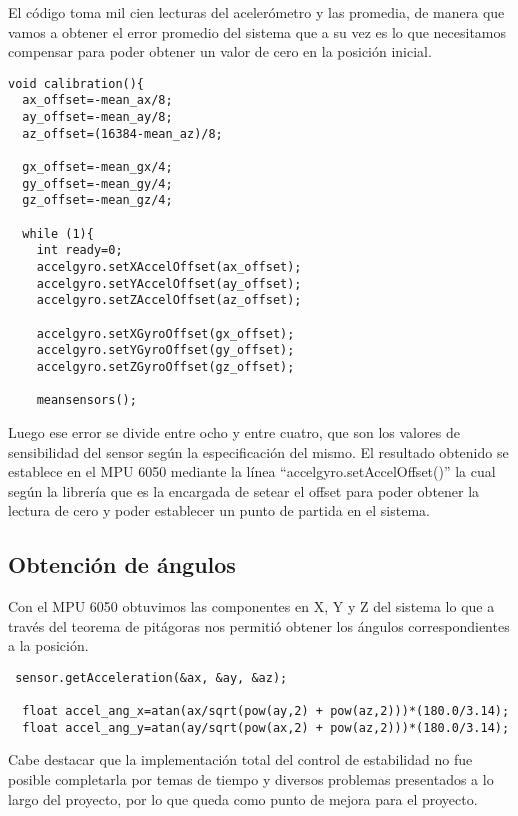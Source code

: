 \documentclass[12pt,letterpaper]{IEEEtran}
\begin{document}
El código toma mil cien lecturas del acelerómetro y las promedia, de manera que vamos a obtener el error promedio del sistema que a su vez es lo que necesitamos compensar para poder obtener un valor de cero en la posición inicial.\\

\begin{lstlisting}
void calibration(){
  ax_offset=-mean_ax/8;
  ay_offset=-mean_ay/8;
  az_offset=(16384-mean_az)/8;
 
  gx_offset=-mean_gx/4;
  gy_offset=-mean_gy/4;
  gz_offset=-mean_gz/4;
  
  while (1){
    int ready=0;
    accelgyro.setXAccelOffset(ax_offset);
    accelgyro.setYAccelOffset(ay_offset);
    accelgyro.setZAccelOffset(az_offset);
 
    accelgyro.setXGyroOffset(gx_offset);
    accelgyro.setYGyroOffset(gy_offset);
    accelgyro.setZGyroOffset(gz_offset);
 
    meansensors();
\end{lstlisting}

Luego ese error se divide entre ocho y entre cuatro, que son los valores de sensibilidad del sensor según la especificación del mismo. El resultado obtenido se establece en el MPU 6050 mediante la línea ``accelgyro.setAccelOffset()'' la cual según la librería que es la encargada de setear el offset para poder obtener la lectura de cero y poder establecer un punto de partida en el sistema.

\subsection*{Obtención de ángulos}

Con el MPU 6050 obtuvimos las componentes en X, Y y Z del sistema lo que a través del teorema de pitágoras nos permitió obtener los ángulos correspondientes a la posición.\\

\begin{lstlisting}
 sensor.getAcceleration(&ax, &ay, &az);

  float accel_ang_x=atan(ax/sqrt(pow(ay,2) + pow(az,2)))*(180.0/3.14);
  float accel_ang_y=atan(ay/sqrt(pow(ax,2) + pow(az,2)))*(180.0/3.14);
\end{lstlisting}

Cabe destacar que la implementación total del control de estabilidad no fue posible completarla por temas de tiempo y diversos problemas presentados a lo largo del proyecto, por lo que queda como punto de mejora para el proyecto.\\
\end{document}
